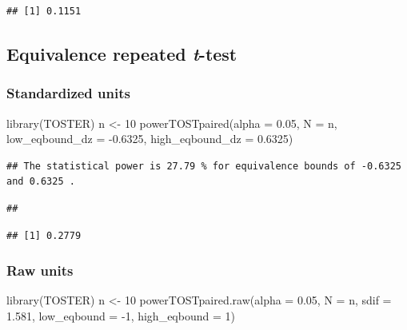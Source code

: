 \documentclass[
]{krantz}
\makeatletter
\newenvironment{Shaded}{\begin{snugshade}}{\end{snugshade}}
\newcommand{\AttributeTok}[1]{\textcolor[rgb]{0.61,0.61,0.61}{#1}}
\newcommand{\DecValTok}[1]{\textcolor[rgb]{0.06,0.06,0.06}{#1}}
\newcommand{\FloatTok}[1]{\textcolor[rgb]{0.06,0.06,0.06}{#1}}
\newcommand{\FunctionTok}[1]{\textcolor[rgb]{0,0,0}{#1}}
\newcommand{\NormalTok}[1]{#1}
\newcommand{\OtherTok}[1]{\textcolor[rgb]{0.37,0.37,0.37}{#1}}
\newcommand{\SpecialCharTok}[1]{\textcolor[rgb]{0,0,0}{#1}}
\newenvironment{kframe}{%
\medskip{}
\setlength{\fboxsep}{.8em}
 \def\at@end@of@kframe{}%
 \ifinner\ifhmode%
  \def\at@end@of@kframe{\end{minipage}}%
  \begin{minipage}{\columnwidth}%
 \fi\fi%
 \def\FrameCommand##1{\hskip\@totalleftmargin \hskip-\fboxsep
 \colorbox{shadecolor}{##1}\hskip-\fboxsep
     \hskip-\linewidth \hskip-\@totalleftmargin \hskip\columnwidth}%
 \MakeFramed {\advance\hsize-\width
   \@totalleftmargin\z@ \linewidth\hsize
   \@setminipage}}%
 {\par\unskip\endMakeFramed%
 \at@end@of@kframe}
\renewenvironment{Shaded}{\begin{kframe}}{\end{kframe}}
\makeatother
\begin{document}
\begin{verbatim}
## [1] 0.1151
\end{verbatim}

\hypertarget{equivalence-repeated-t-test}{%
\subsection{\texorpdfstring{Equivalence repeated \emph{t}-test}{Equivalence repeated t-test}}\label{equivalence-repeated-t-test}}

\hypertarget{standardized-units-6}{%
\subsubsection{Standardized units}\label{standardized-units-6}}

\begin{Shaded}
\begin{Highlighting}[]
\FunctionTok{library}\NormalTok{(TOSTER)}
\NormalTok{n }\OtherTok{\textless{}{-}} \DecValTok{10}
\FunctionTok{powerTOSTpaired}\NormalTok{(}\AttributeTok{alpha =} \FloatTok{0.05}\NormalTok{,}
                \AttributeTok{N =}\NormalTok{ n,}
                \AttributeTok{low\_eqbound\_dz =} \SpecialCharTok{{-}}\FloatTok{0.6325}\NormalTok{,}
                \AttributeTok{high\_eqbound\_dz =} \FloatTok{0.6325}\NormalTok{)}
\end{Highlighting}
\end{Shaded}

\begin{verbatim}
## The statistical power is 27.79 % for equivalence bounds of -0.6325 and 0.6325 .
\end{verbatim}

\begin{verbatim}
## 
\end{verbatim}

\begin{verbatim}
## [1] 0.2779
\end{verbatim}

\hypertarget{raw-units-5}{%
\subsubsection{Raw units}\label{raw-units-5}}

\begin{Shaded}
\begin{Highlighting}[]
\FunctionTok{library}\NormalTok{(TOSTER)}
\NormalTok{n }\OtherTok{\textless{}{-}} \DecValTok{10}
\FunctionTok{powerTOSTpaired.raw}\NormalTok{(}\AttributeTok{alpha =} \FloatTok{0.05}\NormalTok{,}
                    \AttributeTok{N =}\NormalTok{ n,}
                    \AttributeTok{sdif =} \FloatTok{1.581}\NormalTok{,}
                    \AttributeTok{low\_eqbound =} \SpecialCharTok{{-}}\DecValTok{1}\NormalTok{,}
                    \AttributeTok{high\_eqbound =} \DecValTok{1}\NormalTok{)}
\end{Highlighting}
\end{Shaded}
\end{document}
